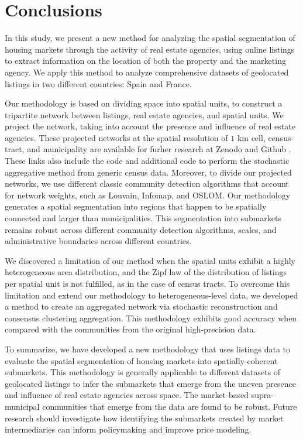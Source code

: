 \section{Conclusions}
\label{sec:conclusions}

In this study, we present a new method for analyzing the spatial segmentation of housing markets through the activity of real estate agencies, using online listings to extract information on the location of both the property and the marketing agency. We apply this method to analyze comprehensive datasets of geolocated listings in two different countries: Spain and France. 

Our methodology is based on dividing space into spatial units, to construct a tripartite network between listings, real estate agencies, and spatial units. We project the network, taking into account the presence and influence of real estate agencies. These projected networks at the spatial resolution of $1$ km cell, census-tract, and municipality are available for furher research at Zenodo \cite{zenodo-2024} and Github \cite{Abella-github-2024}. These links also include the code and additional code to perform the stochastic aggregative method from generic census data. Moreover, to divide our projected networks, we use different classic community detection algorithms that account for network weights, such as Louvain, Infomap, and OSLOM. Our methodology generates a spatial segmentation into regions that happen to be spatially connected and larger than municipalities. This segmentation into submarkets remains robust across different community detection algorithms, scales, and administrative boundaries across different countries.

We discovered a limitation of our method when the spatial units exhibit a highly heterogeneous area distribution, and the Zipf law of the distribution of listings per spatial unit is not fulfilled, as in the case of census tracts. To overcome this limitation and extend our methodology to heterogeneous-level data, we developed a method to create an aggregated network via stochastic reconstruction and consensus clustering aggregation. This methodology exhibits good accuracy when compared with the communities from the original high-precision data.

To summarize, we have developed a new methodology that uses listings data to evaluate the spatial segmentation of housing markets into spatially-coherent submarkets. This methodology is generally applicable to different datasets of geolocated listings to infer the submarkets that emerge from the uneven presence and influence of real estate agencies across space. The market-based supra-municipal communities that emerge from the data are found to be robust. Future research should investigate how identifying the submarkets created by market intermediaries can inform policymaking and improve price modeling.